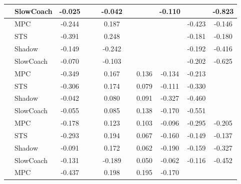 \begin{tabular}{|l|l|*{9}{c|}}
                                                           & SlowCoach &   -0.025 &        &        & -0.042 &     &     &  -0.110 &      &   -0.823 \\
\midrule
[True, False, False, True, False, False, False, True, True] & MPC &   -0.244 &        &        &  0.187 &     &     &      &  -0.423 &   -0.146 \\
                                                           & STS &   -0.391 &        &        &  0.248 &     &     &      &  -0.181 &   -0.180 \\
                                                           & Shadow &   -0.149 &        &        & -0.242 &     &     &      &  -0.192 &   -0.416 \\
                                                           & SlowCoach &   -0.070 &        &        & -0.103 &     &     &      &  -0.202 &   -0.625 \\
\midrule
[True, False, False, True, False, True, True, True, False] & MPC &   -0.349 &        &        &  0.167 &     &  0.136 &  -0.134 &  -0.213 &       \\
                                                           & STS &   -0.306 &        &        &  0.174 &     &  0.079 &  -0.111 &  -0.330 &       \\
                                                           & Shadow &   -0.042 &        &        &  0.080 &     &  0.091 &  -0.327 &  -0.460 &       \\
                                                           & SlowCoach &   -0.055 &        &        &  0.085 &     &  0.138 &  -0.170 &  -0.551 &       \\
\midrule
[True, False, False, True, False, True, True, True, True] & MPC &   -0.178 &        &        &  0.123 &     &  0.103 &  -0.096 &  -0.295 &   -0.205 \\
                                                           & STS &   -0.293 &        &        &  0.194 &     &  0.067 &  -0.160 &  -0.149 &   -0.137 \\
                                                           & Shadow &   -0.091 &        &        &  0.172 &     &  0.062 &  -0.190 &  -0.159 &   -0.327 \\
                                                           & SlowCoach &   -0.131 &        &        & -0.189 &     &  0.050 &  -0.062 &  -0.116 &   -0.452 \\
\midrule
[True, False, False, True, False, True, True, False, False] & MPC &   -0.437 &        &        &  0.198 &     &  0.195 &  -0.170 &      &       \\

\end{tabular}
